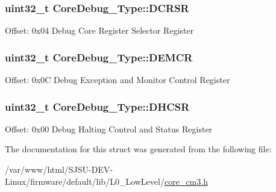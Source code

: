 \subsubsection[{\texorpdfstring{D\+C\+R\+SR}{DCRSR}}]{ uint32\+\_\+t Core\+Debug\+\_\+\+Type\+::\+D\+C\+R\+SR}\hypertarget{structCoreDebug__Type_afefa84bce7497652353a1b76d405d983}{}\label{structCoreDebug__Type_afefa84bce7497652353a1b76d405d983}
Offset\+: 0x04 Debug Core Register Selector Register 
\subsubsection[{\texorpdfstring{D\+E\+M\+CR}{DEMCR}}]{ uint32\+\_\+t Core\+Debug\+\_\+\+Type\+::\+D\+E\+M\+CR}\hypertarget{structCoreDebug__Type_a5cdd51dbe3ebb7041880714430edd52d}{}\label{structCoreDebug__Type_a5cdd51dbe3ebb7041880714430edd52d}
Offset\+: 0x0C Debug Exception and Monitor Control Register 
\subsubsection[{\texorpdfstring{D\+H\+C\+SR}{DHCSR}}]{ uint32\+\_\+t Core\+Debug\+\_\+\+Type\+::\+D\+H\+C\+SR}\hypertarget{structCoreDebug__Type_a25c14c022c73a725a1736e903431095d}{}\label{structCoreDebug__Type_a25c14c022c73a725a1736e903431095d}
Offset\+: 0x00 Debug Halting Control and Status Register 

The documentation for this struct was generated from the following file\+:\begin{DoxyCompactItemize}
\item 
/var/www/html/\+S\+J\+S\+U-\/\+D\+E\+V-\/\+Linux/firmware/default/lib/\+L0\+\_\+\+Low\+Level/\hyperlink{core__cm3_8h}{core\+\_\+cm3.\+h}\end{DoxyCompactItemize}
